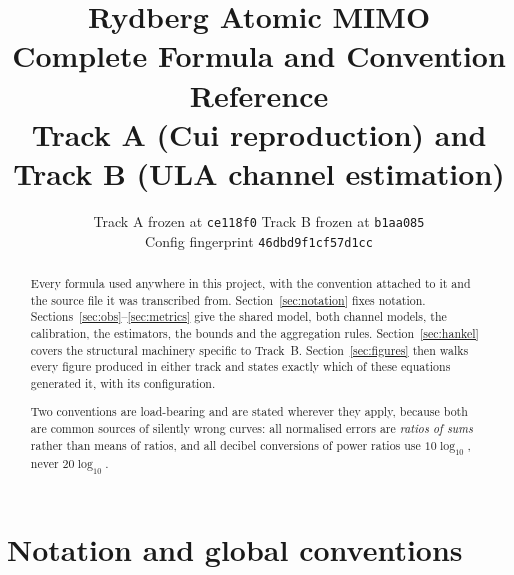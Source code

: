 \documentclass[11pt,a4paper]{article}
\title{\textbf{Rydberg Atomic MIMO}\\[2mm]
\large Complete Formula and Convention Reference\\[1mm]
\normalsize Track A (Cui reproduction) and Track B (ULA channel estimation)}
\author{}
\date{Track A frozen at \texttt{ce118f0} \quad\textbullet\quad
      Track B frozen at \texttt{b1aa085}\\[1mm]
      \small Config fingerprint \texttt{46dbd9f1cf57d1cc}}
\begin{document}
\maketitle
\thispagestyle{fancy}

\begin{abstract}
\noindent
Every formula used anywhere in this project, with the convention attached to
it and the source file it was transcribed from. Section~\ref{sec:notation}
fixes notation. Sections~\ref{sec:obs}--\ref{sec:metrics} give the shared
model, both channel models, the calibration, the estimators, the bounds and
the aggregation rules. Section~\ref{sec:hankel} covers the structural
machinery specific to Track~B. Section~\ref{sec:figures} then walks every
figure produced in either track and states exactly which of these equations
generated it, with its configuration.

Two conventions are load-bearing and are stated wherever they apply, because
both are common sources of silently wrong curves: all normalised errors are
\emph{ratios of sums} rather than means of ratios, and all decibel
conversions of power ratios use $10\log_{10}$, never $20\log_{10}$.
\end{abstract}

\tableofcontents
\newpage

\section{Notation and global conventions}\label{sec:notation}
\end{document}
